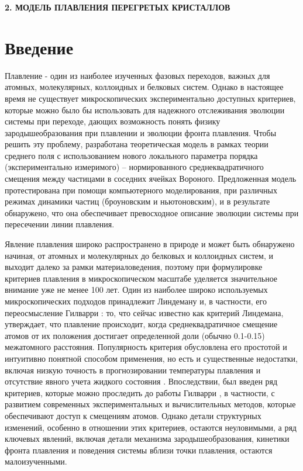
\begin{center}
\textbf{\large 2. МОДЕЛЬ ПЛАВЛЕНИЯ ПЕРЕГРЕТЫХ КРИСТАЛЛОВ}
\end{center}


\section{Введение}

Плавление - один из наиболее изученных фазовых переходов, важных для атомных, молекулярных, коллоидных и белковых систем.
Однако в настоящее время не существует микроскопических экспериментально доступных критериев, которые можно было бы использовать для надежного отслеживания эволюции системы при переходе, дающих возможность  понять физику зародышеобразования при плавлении и эволюции фронта плавления.
Чтобы решить эту проблему, разработана теоретическая модель в рамках теории среднего поля с использованием нового локального параметра порядка (экспериментально измеримого) -- нормированного среднеквадратичного смещения между частицами в соседних ячейках Вороного.
Предложенная модель протестирована при помощи компьютерного моделирования, при различных режимах динамики частиц (броуновским и ньютоновским), и в результате обнаружено, что она обеспечивает превосходное описание эволюции системы при пересечении линии плавления.

Явление плавления широко распространено в природе и может быть обнаружено начиная, от атомных и молекулярных до белковых и коллоидных систем, и выходит далеко за рамки материаловедения, поэтому при формулировке критериев плавления в микроскопическом масштабе уделяется значительное внимание уже не менее 100 лет.
Один из наиболее широко используемых микроскопических подходов принадлежит Линдеману \cite{lindemann1910} и, в частности, его переосмысление Гилварри \cite{10.1103/physrev.102.308}: то, что сейчас известно как критерий Линдемана, утверждает, что плавление происходит, когда среднеквадратичное смещение атомов от их положения достигает определенной доли (обычно 0.1-0.15) межатомного расстояния.
Популярность критерия обусловлена его простотой и интуитивно понятной способом применения, но есть и существенные недостатки, включая низкую точность в прогнозировании температуры плавления и отсутствие явного учета жидкого состояния \cite{10.1098/rspa.1991.0068}.
Впоследствии, был введен ряд критериев, которые можно проследить до работы Гилварри \cite{10.1063/1.1426419}, в частности, с развитием современных экспериментальных и вычислительных методов, которые обеспечивают доступ к смещениям атомов.
Однако детали структурных изменений, особенно в отношении этих критериев, остаются неуловимыми, а ряд ключевых явлений, включая детали механизма зародышеобразования, кинетики фронта плавления и поведения системы вблизи точки плавления, остаются малоизученными.


